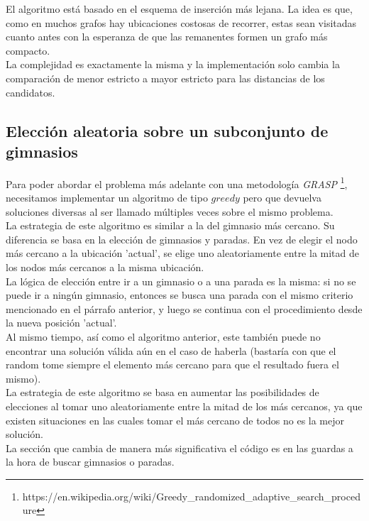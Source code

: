     El algoritmo está basado en el esquema de inserción más lejana. La idea es que, como en muchos grafos hay ubicaciones costosas de recorrer, estas sean visitadas cuanto antes con la esperanza de que las remanentes formen un grafo más compacto.
    \\

    La complejidad es exactamente la misma y la implementación solo cambia la comparación de menor estricto a mayor estricto para las distancias de los candidatos.


    \subsection{Elección aleatoria sobre un subconjunto de gimnasios}
    Para poder abordar el problema más adelante con una metodología \emph{GRASP} \footnote{https://en.wikipedia.org/wiki/Greedy_randomized_adaptive_search_procedure}, necesitamos implementar un algoritmo de tipo $greedy$ pero que devuelva soluciones diversas al ser llamado múltiples veces sobre el mismo problema.
    \\

    La estrategia de este algoritmo es similar a la del gimnasio más cercano. Su diferencia se basa en la elección de gimnasios y paradas. En vez de elegir el nodo más cercano a la ubicación 'actual', se elige uno aleatoriamente entre la mitad de los nodos más cercanos a la misma ubicación.
    \\

    La lógica de elección entre ir a un gimnasio o a una parada es la misma: si no se puede ir a ningún gimnasio, entonces se busca una parada con el mismo criterio mencionado en el párrafo anterior, y luego se continua con el procedimiento desde la nueva posición 'actual'.
    \\

    Al mismo tiempo, así como el algoritmo anterior, este también puede no encontrar una solución válida aún en el caso de haberla (bastaría con que el random tome siempre el elemento más cercano para que el resultado fuera el mismo).
    \\

    La estrategia de este algoritmo se basa en aumentar las posibilidades de elecciones al tomar uno aleatoriamente entre la mitad de los más cercanos, ya que existen situaciones en las cuales tomar el más cercano de todos no es la mejor solución.
    \\

    La sección que cambia de manera más significativa el código es en las guardas a la hora de buscar gimnasios o paradas.
    \\

